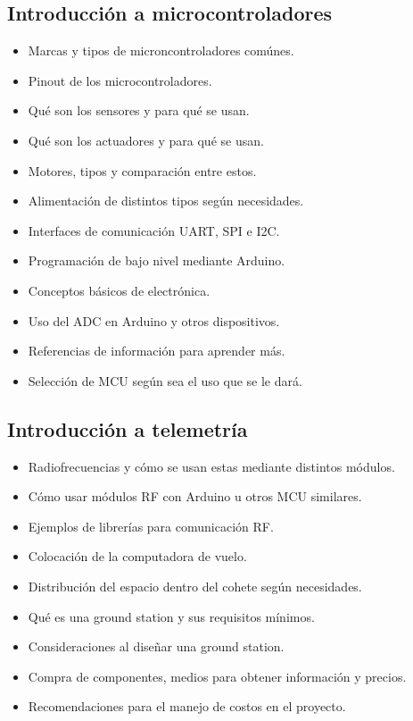 ﻿\documentclass[letterpaper]{article}
\begin{document}
\subsection{Introducción a microcontroladores}
\begin{itemize}
    \item Marcas y tipos de microncontroladores comúnes.
    \item Pinout de los microcontroladores.
    \item Qué son los sensores y para qué se usan.
    \item Qué son los actuadores y para qué se usan.
    \item Motores, tipos y comparación entre estos.
    \item Alimentación de distintos tipos según necesidades.
    \item Interfaces de comunicación UART, SPI e I2C.
    \item Programación de bajo nivel mediante Arduino.
    \item Conceptos básicos de electrónica.
    \item Uso del ADC en Arduino y otros dispositivos.
    \item Referencias de información para aprender más.
    \item Selección de MCU según sea el uso que se le dará.
\end{itemize}
\subsection{Introducción a telemetría}
\begin{itemize}
    \item Radiofrecuencias y cómo se usan estas mediante distintos módulos.
    \item Cómo usar módulos RF con Arduino u otros MCU similares.
    \item Ejemplos de librerías para comunicación RF.
    \item Colocación de la computadora de vuelo.
    \item Distribución del espacio dentro del cohete según necesidades.
    \item Qué es una ground station y sus requisitos mínimos.
    \item Consideraciones al diseñar una ground station.
    \item Compra de componentes, medios para obtener información y precios.
    \item Recomendaciones para el manejo de costos en el proyecto.
\end{itemize}
\end{document}

